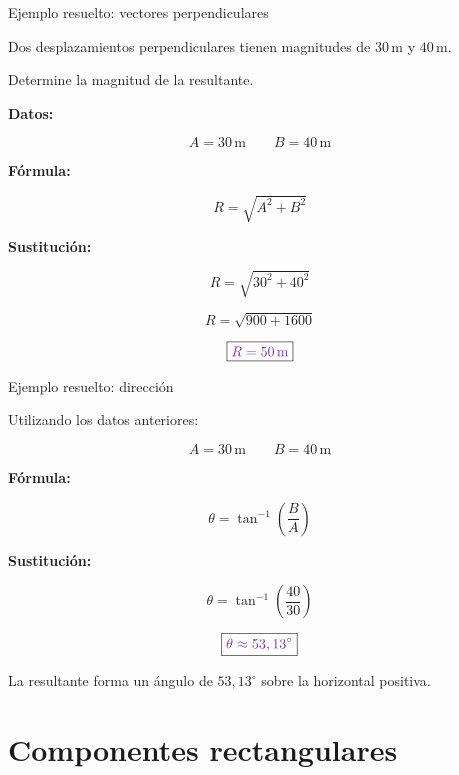 \documentclass[aspectratio=169,11pt]{beamer}
\newcommand{\resp}[1]{
 \[
 \boxed{\color{morado}{#1}}
 \]
}
\begin{document}
\begin{frame}{Ejemplo resuelto: vectores perpendiculares}

Dos desplazamientos perpendiculares
tienen magnitudes de
\(30\,\mathrm{m}\) y \(40\,\mathrm{m}\).

Determine la magnitud de la resultante.

\textbf{Datos:}

\[
A=30\,\mathrm{m}
\qquad
B=40\,\mathrm{m}
\]

\textbf{Fórmula:}

\[
R=\sqrt{A^2+B^2}
\]

\textbf{Sustitución:}

\[
R=\sqrt{30^2+40^2}
\]

\[
R=\sqrt{900+1600}
\]

\resp{R=50\,\mathrm{m}}

\end{frame}

\begin{frame}{Ejemplo resuelto: dirección}

Utilizando los datos anteriores:

\[
A=30\,\mathrm{m}
\qquad
B=40\,\mathrm{m}
\]

\textbf{Fórmula:}

\[
\theta=\tan^{-1}\left(\frac{B}{A}\right)
\]

\textbf{Sustitución:}

\[
\theta=\tan^{-1}\left(\frac{40}{30}\right)
\]

\resp{\theta\approx53,13^\circ}

La resultante forma un ángulo
de \(53,13^\circ\) sobre
la horizontal positiva.

\end{frame}

\section{Componentes rectangulares}
\end{document}
